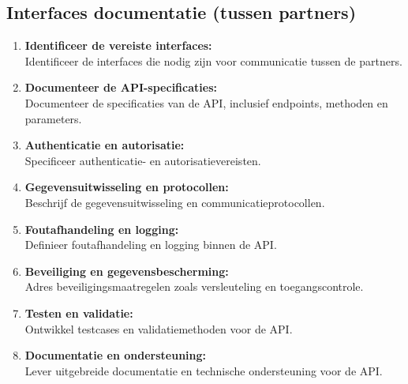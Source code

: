 \documentclass{article} %
\begin{document}
\subsection{Interfaces documentatie (tussen partners)}
\begin{enumerate}
    \item \textbf{Identificeer de vereiste interfaces:} \\
    \indent Identificeer de interfaces die nodig zijn voor communicatie tussen de partners.
    \item \textbf{Documenteer de API-specificaties:} \\
    \indent Documenteer de specificaties van de API, inclusief endpoints, methoden en parameters.
    \item \textbf{Authenticatie en autorisatie:} \\
    \indent Specificeer authenticatie- en autorisatievereisten.
    \item \textbf{Gegevensuitwisseling en protocollen:} \\
    \indent Beschrijf de gegevensuitwisseling en communicatieprotocollen.
    \item \textbf{Foutafhandeling en logging:} \\
    \indent Definieer foutafhandeling en logging binnen de API.
    \item \textbf{Beveiliging en gegevensbescherming:} \\
    \indent Adres beveiligingsmaatregelen zoals versleuteling en toegangscontrole.
    \item \textbf{Testen en validatie:} \\
    \indent Ontwikkel testcases en validatiemethoden voor de API.
    \item \textbf{Documentatie en ondersteuning:} \\
    \indent Lever uitgebreide documentatie en technische ondersteuning voor de API.
\end{enumerate}
\end{document}
